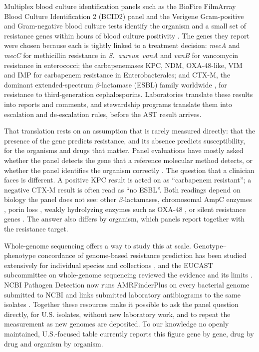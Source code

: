 \documentclass[10pt,twocolumn,letterpaper]{article}
\newcommand{\g}[1]{\textit{#1}}  %
\newcommand{\sau}{\textit{S.~aureus}}
\begin{document}
Multiplex blood culture identification panels such as the BioFire FilmArray Blood Culture Identification 2 (BCID2) panel
and the Verigene Gram-positive and Gram-negative blood culture tests identify the organism and a small set of resistance
genes within hours of blood culture positivity \cite{bcid2_2022,verigene2015}. The genes they report were
chosen because each is tightly linked to a treatment decision: \g{mecA} and \g{mecC} for methicillin resistance in
\sau{}; \g{vanA} and \g{vanB} for vancomycin resistance in enterococci; the carbapenemases KPC, NDM, OXA-48-like, VIM and
IMP for carbapenem resistance in Enterobacterales; and CTX-M, the dominant extended-spectrum $\beta$-lactamase (ESBL)
family worldwide \cite{bevan2017,bush2020}, for resistance to third-generation cephalosporins. Laboratories translate these
results into reports and comments, and stewardship programs translate them into escalation and de-escalation rules,
before the AST result arrives.

That translation rests on an assumption that is rarely measured directly: that the presence of the gene predicts
resistance, and its absence predicts susceptibility, for the organisms and drugs that matter. Panel evaluations have mostly
asked whether the panel detects the gene that a reference molecular method detects, or whether the panel identifies the
organism correctly \cite{bcid2_2022,verigene2015}. The question that a clinician faces is different. A positive KPC result
is acted on as ``carbapenem resistant''; a negative CTX-M result is often read as ``no ESBL''. Both readings depend on
biology the panel does not see: other $\beta$-lactamases, chromosomal AmpC enzymes \cite{jacoby2009}, porin loss
\cite{tamma2017,pitout2015}, weakly hydrolyzing enzymes such as OXA-48 \cite{poirel2012}, or silent resistance genes
\cite{szakacs2014,vanA2025}. The answer also differs by organism, which panels report together with the resistance target.

Whole-genome sequencing offers a way to study this at scale. Genotype--phenotype concordance of genome-based resistance
prediction has been studied extensively for individual species and collections \cite{stoesser2013,gordon2014,feldgarden2019,su2019},
and the EUCAST subcommittee on whole-genome sequencing reviewed the evidence and its limits \cite{ellington2017}. NCBI
Pathogen Detection now runs AMRFinderPlus \cite{feldgarden2021} on every bacterial genome submitted to NCBI and links
submitted laboratory antibiograms to the same isolates \cite{ncbi2025,ncbipd}. Together these resources make it possible to
ask the panel question directly, for U.S. isolates, without new laboratory work, and to repeat the measurement as new
genomes are deposited. To our knowledge no openly maintained, U.S.-focused table currently reports this figure gene by
gene, drug by drug and organism by organism.
\end{document}
